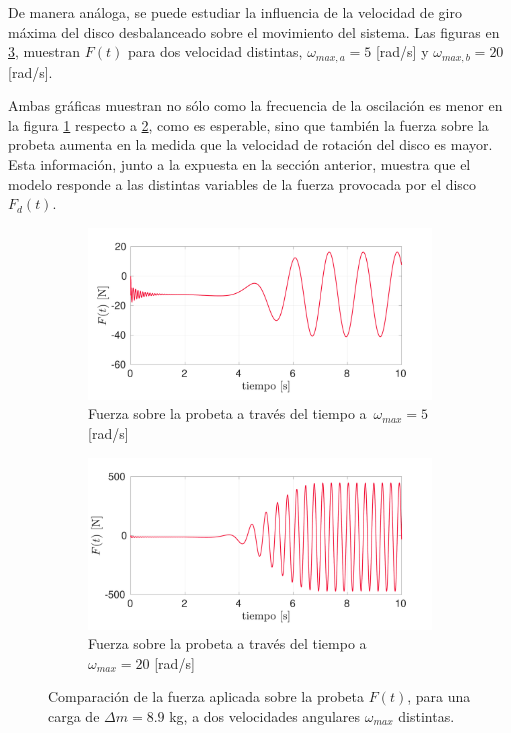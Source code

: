 De manera análoga, se puede estudiar la influencia de la velocidad de giro máxima del disco desbalanceado sobre el movimiento del sistema. Las figuras en \ref{fig:f_w520}, muestran $F(t)$ para dos velocidad distintas, $\omega_{max,a} = 5$ [rad/s] y $\omega_{max,b}=20$ [rad/s]. 

Ambas gráficas muestran no sólo como la frecuencia de la oscilación es menor en la figura \ref{fig:f_w5} respecto a \ref{fig:f_w20}, como es esperable, sino que también la fuerza sobre la probeta aumenta en la medida que la velocidad de rotación del disco es mayor. Esta información, junto a la expuesta en la sección anterior, muestra que el modelo responde a las distintas variables de la fuerza provocada por el disco $F_d(t)$. 

\begin{figure}[p]
\centering
	\begin{subfigure}{1\linewidth}
		\centering
		\includegraphics[width=\linewidth, trim={0cm 0cm 2cm 0cm},clip]{Imagenes/f_w5.pdf}
		\caption{Fuerza sobre la probeta a través del tiempo a $\,\omega_{max}=5$ [rad/s]}
		\label{fig:f_w5}
	\end{subfigure}
	\begin{subfigure}{1\linewidth}
		\centering
		\includegraphics[width=\linewidth, trim={0cm 0cm 2cm 0cm},clip]{Imagenes/f_w20.pdf}
		\caption{Fuerza sobre la probeta a través del tiempo a $\omega_{max}=20$ [rad/s]}
		\label{fig:f_w20}
	\end{subfigure}
\caption{Comparación de la fuerza aplicada sobre la probeta $F(t)$, para una carga de $\Delta m = 8.9$ kg, a dos velocidades angulares $\omega_{max}$ distintas.}
\label{fig:f_w520}
\end{figure}

